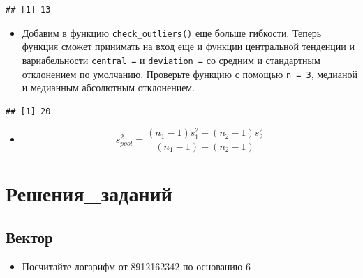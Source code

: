 \documentclass[]{book}
\newenvironment{Shaded}{\begin{snugshade}}{\end{snugshade}}
\newcommand{\KeywordTok}[1]{\textcolor[rgb]{0.13,0.29,0.53}{\textbf{#1}}}
\newcommand{\DataTypeTok}[1]{\textcolor[rgb]{0.13,0.29,0.53}{#1}}
\newcommand{\DecValTok}[1]{\textcolor[rgb]{0.00,0.00,0.81}{#1}}
\newcommand{\OperatorTok}[1]{\textcolor[rgb]{0.81,0.36,0.00}{\textbf{#1}}}
\newcommand{\NormalTok}[1]{#1}
\providecommand{\tightlist}{%
  \setlength{\itemsep}{0pt}\setlength{\parskip}{0pt}}
\begin{document}
\begin{Shaded}
\end{Shaded}

\begin{verbatim}
## [1] 13
\end{verbatim}

\begin{itemize}
\tightlist
\item
  Добавим в функцию \texttt{check\_outliers()} еще больше гибкости.
  Теперь функция сможет принимать на вход еще и функции центральной
  тенденции и вариабельности \texttt{central\ =} и \texttt{deviation\ =}
  со средним и стандартным отклонением по умолчанию. Проверьте функцию с
  помощью \texttt{n\ =\ 3}, медианой и медианным абсолютным отклонением.
\end{itemize}

\begin{Shaded}
\end{Shaded}

\begin{verbatim}
## [1] 20
\end{verbatim}

\begin{itemize}
\tightlist
\item
  \[s^2_{pool} = \frac {(n_1-1)s^2_1 + (n_2-1)s^2_2} {(n_1 - 1) + (n_2 -1)}\]
\end{itemize}

\chapter{Решения\_заданий}\label{solutions}

\section{Вектор}\label{solvvec_task_1}

\begin{itemize}
\tightlist
\item
  Посчитайте логарифм от 8912162342 по основанию 6
\end{itemize}
\end{document}

